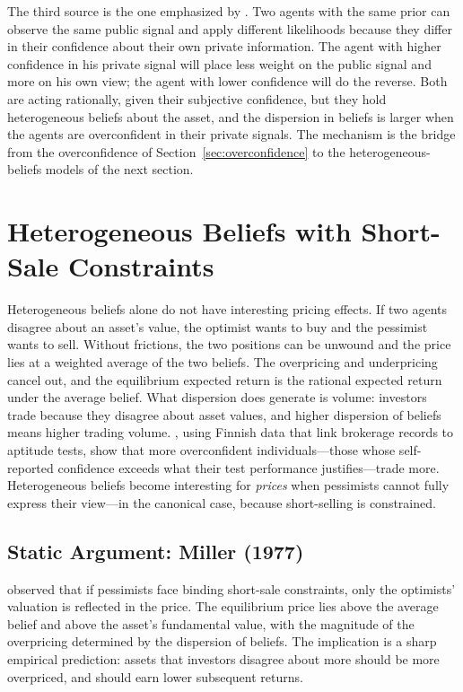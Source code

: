 The third source is the one emphasized by \citet{daniel1998}. Two agents with the same prior can observe the same public signal and apply different likelihoods because they differ in their confidence about their own private information. The agent with higher confidence in his private signal will place less weight on the public signal and more on his own view; the agent with lower confidence will do the reverse. Both are acting rationally, given their subjective confidence, but they hold heterogeneous beliefs about the asset, and the dispersion in beliefs is larger when the agents are overconfident in their private signals. The mechanism is the bridge from the overconfidence of Section~\ref{sec:overconfidence} to the heterogeneous-beliefs models of the next section.

\section{Heterogeneous Beliefs with Short-Sale Constraints}
\label{sec:hetwithssc}

Heterogeneous beliefs alone do not have interesting pricing effects. If two agents disagree about an asset's value, the optimist wants to buy and the pessimist wants to sell. Without frictions, the two positions can be unwound and the price lies at a weighted average of the two beliefs. The overpricing and underpricing cancel out, and the equilibrium expected return is the rational expected return under the average belief. What dispersion does generate is volume: investors trade because they disagree about asset values, and higher dispersion of beliefs means higher trading volume. \citet{grinblatt2009}, using Finnish data that link brokerage records to aptitude tests, show that more overconfident individuals---those whose self-reported confidence exceeds what their test performance justifies---trade more. Heterogeneous beliefs become interesting for \emph{prices} when pessimists cannot fully express their view---in the canonical case, because short-selling is constrained.

\subsection{Static Argument: Miller (1977)}

\citet{miller1977} observed that if pessimists face binding short-sale constraints, only the optimists' valuation is reflected in the price. The equilibrium price lies above the average belief and above the asset's fundamental value, with the magnitude of the overpricing determined by the dispersion of beliefs. The implication is a sharp empirical prediction: assets that investors disagree about more should be more overpriced, and should earn lower subsequent returns.

